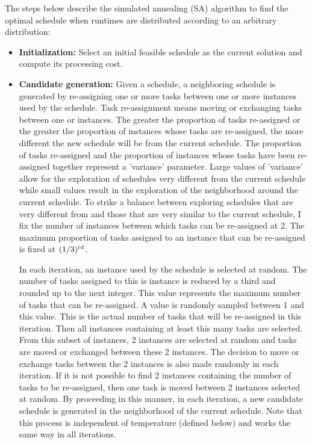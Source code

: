 \documentclass[12pt]{report}
\begin{document}
The steps below describe the simulated annealing (SA) algorithm to find the optimal schedule when runtimes are distributed according to an arbitrary distribution:
\begin{itemize}
	\item \textbf{Initialization:} Select an initial feasible schedule as the current solution and compute its processing cost.
	\item \textbf{Candidate generation:} 
		Given a schedule, a neighboring schedule is generated by re-assigning one or more tasks between one or more instances used by the schedule.
		Task re-assignment means moving or exchanging tasks between one or  instances.
		The greater the proportion of tasks re-assigned or the greater the proportion of instances whose tasks are re-assigned, the more different the new schedule will be from the current schedule.
		The proportion of tasks re-assigned and the proportion of instances whose tasks have been re-assigned together represent a 'variance' parameter. 
		Large values of 'variance' allow for the exploration of schedules very different from the current schedule while small values result in the exploration of the neighborhood around the current schedule.
		To strike a balance between exploring schedules that are very different from and those that are very similar to the current schedule, I fix the number of instances between which tasks can be re-assigned at 2.
		The maximum proportion of tasks assigned to an instance that can be re-assigned is fixed at $(1/3)\textsuperscript{rd}$.

		In each iteration, an instance used by the schedule is selected at random.
		The number of tasks assigned to this is instance is reduced by a third and rounded up to the next integer.
		This value represents the maximum number of tasks that can be re-assigned.
		A value is randomly sampled between 1 and this value.
		This is the actual number of tasks that will be re-assigned in this iteration.
		Then all instances containing at least this many tasks are selected.
		From this subset of instances, 2 instances are selected at random and tasks are moved or exchanged between these 2 instances.
		The decision to move or exchange tasks between the 2 instances is also made randomly in each iteration.
		If it is not possible to find 2 instances containing the number of tasks to be re-assigned, then one task is moved between 2 instances selected at random.
		By proceeding in this manner, in each iteration, a new candidate schedule is generated in the neighborhood of the current schedule.
		Note that this process is independent of temperature (defined below) and works the same way in all iterations.
		

\end{itemize}
\end{document}
